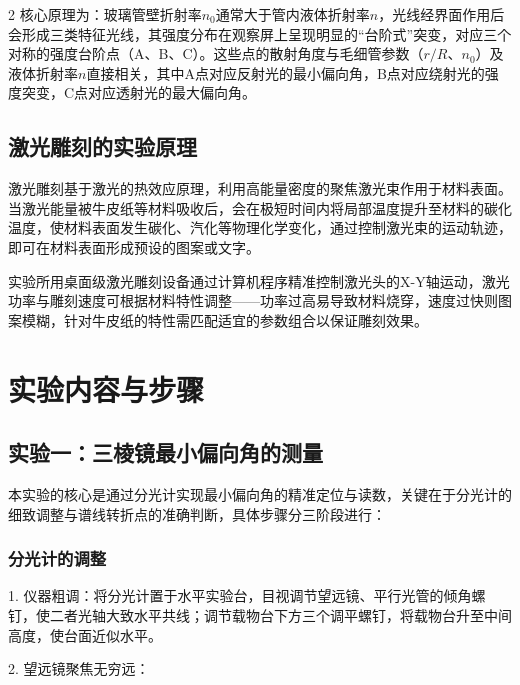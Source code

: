 \documentclass[12pt,a4paper]{article}
\begin{document}
\begin{multicols}{2}
    核心原理为：玻璃管壁折射率$n_0$通常大于管内液体折射率$n$，光线经界面作用后会形成三类特征光线，其强度分布在观察屏上呈现明显的“台阶式”突变，对应三个对称的强度台阶点（A、B、C）。这些点的散射角度与毛细管参数（$r/R$、$n_0$）及液体折射率$n$直接相关，其中A点对应反射光的最小偏向角，B点对应绕射光的强度突变，C点对应透射光的最大偏向角。



    \subsection{\heiti 激光雕刻的实验原理}

    \songti

    激光雕刻基于激光的热效应原理，利用高能量密度的聚焦激光束作用于材料表面。当激光能量被牛皮纸等材料吸收后，会在极短时间内将局部温度提升至材料的碳化温度，使材料表面发生碳化、汽化等物理化学变化，通过控制激光束的运动轨迹，即可在材料表面形成预设的图案或文字。

    实验所用桌面级激光雕刻设备通过计算机程序精准控制激光头的X-Y轴运动，激光功率与雕刻速度可根据材料特性调整——功率过高易导致材料烧穿，速度过快则图案模糊，针对牛皮纸的特性需匹配适宜的参数组合以保证雕刻效果。



    \section{\heiti 实验内容与步骤}

    \subsection{\heiti 实验一：三棱镜最小偏向角的测量}

    \songti

    本实验的核心是通过分光计实现最小偏向角的精准定位与读数，关键在于分光计的细致调整与谱线转折点的准确判断，具体步骤分三阶段进行：



    \subsubsection{\kaishu 分光计的调整}

    1. 仪器粗调：将分光计置于水平实验台，目视调节望远镜、平行光管的倾角螺钉，使二者光轴大致水平共线；调节载物台下方三个调平螺钉，将载物台升至中间高度，使台面近似水平。

    2. 望远镜聚焦无穷远：


\end{multicols}
\end{document}
